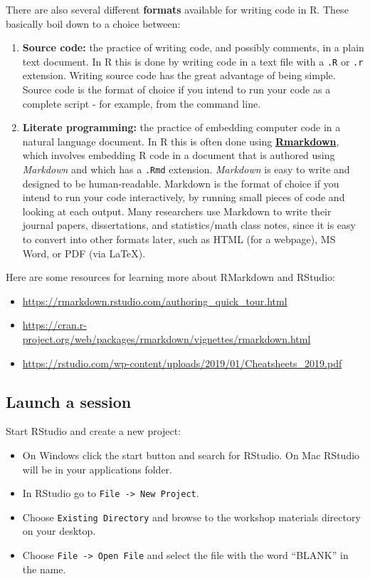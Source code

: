 \documentclass[]{book}
\providecommand{\tightlist}{%
  \setlength{\itemsep}{0pt}\setlength{\parskip}{0pt}}
\begin{document}
There are also several different \textbf{formats} available for writing code in R.
These basically boil down to a choice between:

\begin{enumerate}
\def\labelenumi{\arabic{enumi}.}
\item
  \textbf{Source code:} the practice of writing code, and possibly comments, in a plain text document. In R this is done by writing code in a text file with a \texttt{.R} or \texttt{.r} extension. Writing source code has the great advantage of being simple. Source code is the format of choice if you intend to run your code as a complete script - for example, from the command line.
\item
  \textbf{Literate programming:} the practice of embedding computer code in a natural language document. In R this is often done using \href{https://rmarkdown.rstudio.com/}{\textbf{Rmarkdown}}, which involves embedding R code in a document that is authored using \emph{Markdown} and which has a \texttt{.Rmd} extension. \emph{Markdown} is easy to write and designed to be human-readable. Markdown is the format of choice if you intend to run your code interactively, by running small pieces of code and looking at each output. Many researchers use Markdown to write their journal papers, dissertations, and statistics/math class notes, since it is easy to convert into other formats later, such as HTML (for a webpage), MS Word, or PDF (via LaTeX).
\end{enumerate}

Here are some resources for learning more about RMarkdown and RStudio:

\begin{itemize}
\tightlist
\item
  \url{https://rmarkdown.rstudio.com/authoring_quick_tour.html}
\item
  \url{https://cran.r-project.org/web/packages/rmarkdown/vignettes/rmarkdown.html}
\item
  \url{https://rstudio.com/wp-content/uploads/2019/01/Cheatsheets_2019.pdf}
\end{itemize}

\hypertarget{launch-a-session}{%
\subsection{Launch a session}\label{launch-a-session}}

Start RStudio and create a new project:

\begin{itemize}
\tightlist
\item
  On Windows click the start button and search for RStudio. On Mac
  RStudio will be in your applications folder.
\item
  In RStudio go to \texttt{File\ -\textgreater{}\ New\ Project}.
\item
  Choose \texttt{Existing\ Directory} and browse to the workshop materials directory on your desktop.
\item
  Choose \texttt{File\ -\textgreater{}\ Open\ File} and select the file with the word ``BLANK'' in the name.
\end{itemize}
\end{document}
